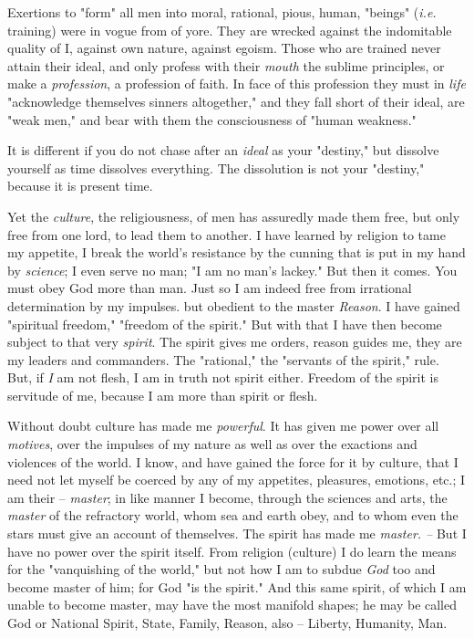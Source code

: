 Exertions to "{}form"{} all men into moral, rational, pious, human, 
"{}beings"{} (\textit{i.e.} training) were in vogue from of yore. They are 
wrecked against the indomitable quality of I, against own nature, against 
egoism. Those who are trained never attain their ideal, and only profess with 
their \textit{mouth} the sublime principles, or make a \textit{profession}, a 
profession of faith. In face of this profession they must in \textit{life} 
"{}acknowledge themselves sinners altogether,"{} and they fall short of their 
ideal, are "{}weak men,"{} and bear with them the consciousness of "{}human 
weakness."{}

It is different if you do not chase after an \textit{ideal} as your 
"{}destiny,"{} but dissolve yourself as time dissolves everything. The 
dissolution is not your "{}destiny,"{} because it is present time.

Yet the \textit{culture}, the religiousness, of men has assuredly made them 
free, but only free from one lord, to lead them to another. I have learned by 
religion to tame my appetite, I break the world's resistance by the cunning 
that is put in my hand by \textit{science}; I even serve no man; "{}I am no 
man's lackey."{} But then it comes. You must obey God more than man. Just so I 
am indeed free from irrational determination by my impulses. but obedient to 
the master \textit{Reason}. I have gained "{}spiritual freedom,"{} "{}freedom 
of the spirit."{} But with that I have then become subject to that very 
\textit{spirit}. The spirit gives me orders, reason guides me, they are my 
leaders and commanders. The "{}rational,"{} the "{}servants of the spirit,"{} 
rule. But, if \textit{I} am not flesh, I am in truth not spirit either. 
Freedom of the spirit is servitude of me, because I am more than spirit or 
flesh.

Without doubt culture has made me \textit{powerful}. It has given me power 
over all \textit{motives}, over the impulses of my nature as well as over the 
exactions and violences of the world. I know, and have gained the force for it 
by culture, that I need not let myself be coerced by any of my appetites, 
pleasures, emotions, etc.; I am their -- \textit{master}; in like manner I 
become, through the sciences and arts, the \textit{master} of the refractory 
world, whom sea and earth obey, and to whom even the stars must give an 
account of themselves. The spirit has made me \textit{master. --} But I have 
no power over the spirit itself. From religion (culture) I do learn the means 
for the "{}vanquishing of the world,"{} but not how I am to subdue 
\textit{God} too and become master of him; for God "{}is the spirit."{} And 
this same spirit, of which I am unable to become master, may have the most 
manifold shapes; he may be called God or National Spirit, State, Family, 
Reason, also -- Liberty, Humanity, Man.


